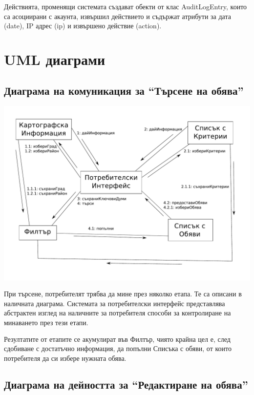 \documentclass[a4paper]{article}
\begin{document}
Действията, променящи системата създават обекти от клас AuditLogEntry, които са асоциирани с акаунта, извършил действието и съдържат атрибути за дата (date), IP адрес (ip) и извършено действие (action).

\clearpage
\section{UML диаграми}

\subsection{Диаграма на комуникация за ``Търсене на обява''} %

\begin{center}
\includegraphics[scale=0.5,keepaspectratio=true]{uml02b}
\end{center}

При търсене, потребителят трябва да мине през няколко етапа.  Те са описани в
наличната диаграма.  Системата за потребителски интерфейс представлява 
абстрактен изглед на наличните за потребителя способи за контролиране на
минаването през тези етапи.

Резултатите от етапите се акумулират във Филтър, чиято крайна цел е, след
сдобиване с достатъчно информация, да попълни Списъка с обяви, от които
потребителя да си избере нужната обява.

\clearpage
\subsection{Диаграма на дейността за ``Редактиране на обява''} %
\end{document}
